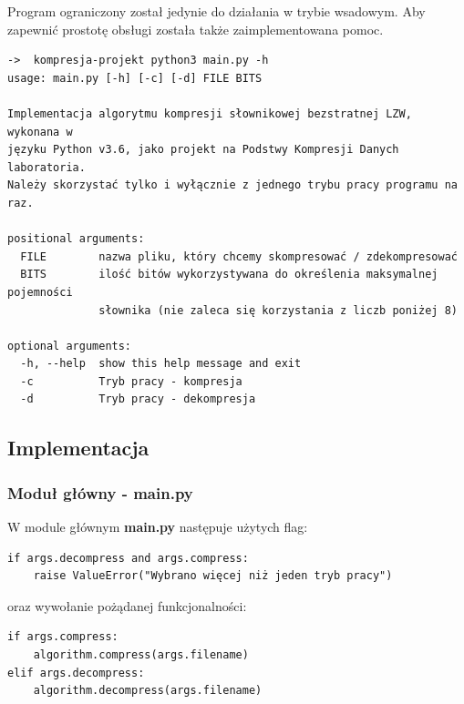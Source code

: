 \documentclass[12pt, a4paper]{article}
\begin{document}
Program ograniczony został jedynie do działania w trybie wsadowym.
Aby zapewnić prostotę obsługi została także zaimplementowana pomoc.
\begin{verbatim}
->  kompresja-projekt python3 main.py -h
usage: main.py [-h] [-c] [-d] FILE BITS

Implementacja algorytmu kompresji słownikowej bezstratnej LZW, wykonana w
języku Python v3.6, jako projekt na Podstwy Kompresji Danych laboratoria.
Należy skorzystać tylko i wyłącznie z jednego trybu pracy programu na raz.

positional arguments:
  FILE        nazwa pliku, który chcemy skompresować / zdekompresować
  BITS        ilość bitów wykorzystywana do określenia maksymalnej pojemności
              słownika (nie zaleca się korzystania z liczb poniżej 8)

optional arguments:
  -h, --help  show this help message and exit
  -c          Tryb pracy - kompresja
  -d          Tryb pracy - dekompresja

\end{verbatim}
\subsection{Implementacja}
\subsubsection{Moduł główny - main.py}
W module głównym \textbf{main.py} następuje użytych flag:
\begin{verbatim}
if args.decompress and args.compress:
    raise ValueError("Wybrano więcej niż jeden tryb pracy")
\end{verbatim}

oraz wywołanie pożądanej funkcjonalności:
\begin{verbatim}
if args.compress:
    algorithm.compress(args.filename)
elif args.decompress:
    algorithm.decompress(args.filename)
\end{verbatim}
\end{document}
